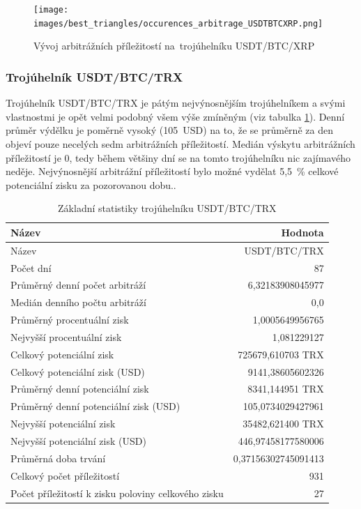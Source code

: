 \documentclass[thesis=B,czech]{FITthesis}[2019/03/21]
\begin{document}
\begin{figure}\centering
	\texttt{[image: images/best\_triangles/occurences\_arbitrage\_USDTBTCXRP.png]}
	\caption{Vývoj arbitrážních příležitostí na~trojúhelníku USDT/BTC/XRP }\label{occurences_arbitrage_USDTBTCXRP}
\end{figure}

\subsubsection{Trojúhelník USDT/BTC/TRX}
Trojúhelník USDT/BTC/TRX je pátým nejvýnosnějším trojúhelníkem a svými vlastnostmi je opět velmi podobný všem výše zmíněným (viz tabulka \ref{USDTBTCTRX_stats}). Denní průměr výdělku je poměrně vysoký (105~USD) na to, že se průměrně za den objeví pouze necelých sedm arbitrážních příležitostí. Medián výskytu arbitrážních příležitostí je 0, tedy během většiny dní se na tomto trojúhelníku nic zajímavého neděje. Nejvýnosnější arbitrážní příležitostí bylo možné vydělat 5,5~\% celkové potenciální zisku za pozorovanou dobu.. 

\begin{table}\centering
\caption{Základní statistiky trojúhelníku USDT/BTC/TRX}
\label{USDTBTCTRX_stats}
\begin{tabular}{|| l | r ||}
\hline Název & Hodnota \\ 
\hline\hline Název & USDT/BTC/TRX \\ 
\hline Počet dní & 87 \\ 
\hline Průměrný denní počet arbitráží & 6,32183908045977 \\ 
\hline Medián denního počtu arbitráží & 0,0 \\ 
\hline Průměrný procentuální zisk & 1,0005649956765 \\ 
\hline Nejvyšší procentuální zisk & 1,081229127 \\ 
\hline Celkový potenciální zisk & 725679,610703 TRX \\ 
\hline Celkový potenciální zisk (USD) & 9141,38605602326 \\ 
\hline Průměrný denní potenciální zisk & 8341,144951 TRX \\ 
\hline Průměrný denní potenciální zisk (USD) & 105,0734029427961 \\ 
\hline Nejvyšší potenciální zisk & 35482,621400 TRX \\ 
\hline Nejvyšší potenciální zisk (USD) & 446,97458177580006 \\ 
\hline Průměrná doba trvání & 0,37156302745091413 \\ 
\hline Celkový počet příležitostí & 931 \\ 
\hline Počet příležitostí k zisku poloviny celkového zisku & 27 \\ 
\hline
\end{tabular}
\end{table}
\end{document}

